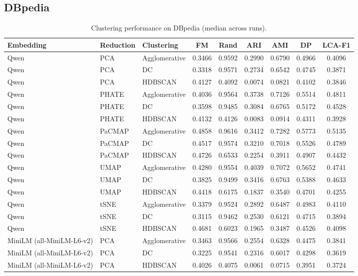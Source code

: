 \subsection{DBpedia}
\begin{table}[t]
\centering
\caption{Clustering performance on DBpedia (median across runs).}
\begin{tabular}{lllcccccc}
\toprule
Embedding & Reduction & Clustering & FM & Rand & ARI & AMI & DP & LCA-F1 \\
\midrule

Qwen & PCA & Agglomerative & 0.3466 & 0.9592 & 0.2990 & 0.6790 & 0.4966 & 0.4096 \\
Qwen & PCA & DC & 0.3318 & 0.9571 & 0.2734 & 0.6542 & 0.4745 & 0.3871 \\
Qwen & PCA & HDBSCAN & 0.4127 & 0.4092 & 0.0074 & 0.0821 & 0.4102 & 0.3846 \\

Qwen & PHATE & Agglomerative & 0.4036 & 0.9564 & 0.3738 & 0.7126 & 0.5514 & 0.4811 \\
Qwen & PHATE & DC & 0.3598 & 0.9485 & 0.3084 & 0.6765 & 0.5172 & 0.4528 \\
Qwen & PHATE & HDBSCAN & 0.4132 & 0.4126 & 0.0083 & 0.0914 & 0.4311 & 0.3928 \\

Qwen & PaCMAP & Agglomerative & 0.4858 & 0.9616 & 0.3412 & 0.7282 & 0.5773 & 0.5135 \\
Qwen & PaCMAP & DC & 0.4517 & 0.9574 & 0.3210 & 0.7018 & 0.5526 & 0.4789 \\
Qwen & PaCMAP & HDBSCAN & 0.4726 & 0.6533 & 0.2254 & 0.3911 & 0.4907 & 0.4432 \\

Qwen & UMAP & Agglomerative & 0.4280 & 0.9554 & 0.4039 & 0.7072 & 0.5652 & 0.4741 \\
Qwen & UMAP & DC & 0.3825 & 0.9499 & 0.3416 & 0.6763 & 0.5388 & 0.4633 \\
Qwen & UMAP & HDBSCAN & 0.4418 & 0.6175 & 0.1837 & 0.3540 & 0.4701 & 0.4255 \\

Qwen & tSNE & Agglomerative & 0.3379 & 0.9524 & 0.2892 & 0.6487 & 0.4983 & 0.4110 \\
Qwen & tSNE & DC & 0.3115 & 0.9462 & 0.2530 & 0.6121 & 0.4715 & 0.3894 \\
Qwen & tSNE & HDBSCAN & 0.4681 & 0.6023 & 0.1965 & 0.3487 & 0.4526 & 0.4098 \\

MiniLM (all-MiniLM-L6-v2) & PCA & Agglomerative & 0.3463 & 0.9566 & 0.2554 & 0.6328 & 0.4475 & 0.3841 \\
MiniLM (all-MiniLM-L6-v2) & PCA & DC & 0.3225 & 0.9541 & 0.2316 & 0.6017 & 0.4298 & 0.3619 \\
MiniLM (all-MiniLM-L6-v2) & PCA & HDBSCAN & 0.4026 & 0.4075 & 0.0061 & 0.0715 & 0.3951 & 0.3724 \\


\end{tabular}
\end{table}
